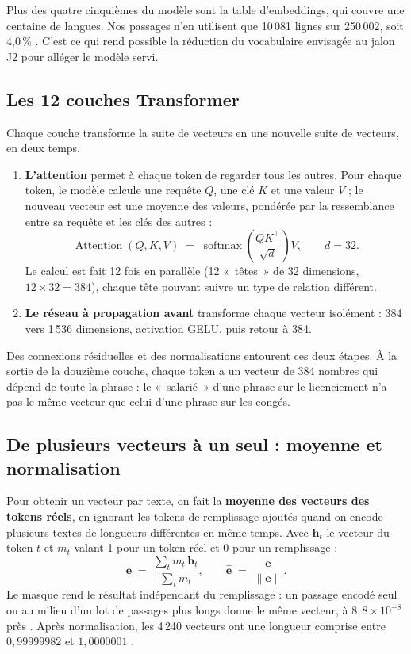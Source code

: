 Plus des quatre cinquièmes du modèle sont la table d'embeddings, qui couvre une centaine de langues. Nos passages
n'en utilisent que 10\,081 lignes sur 250\,002, soit 4,0\,\% \mesure. C'est ce qui rend possible la réduction du
vocabulaire envisagée au jalon J2 pour alléger le modèle servi.

\subsection{Les 12 couches Transformer}

Chaque couche transforme la suite de vecteurs en une nouvelle suite de vecteurs, en deux temps.

\begin{enumerate}
\item \textbf{L'attention} permet à chaque token de regarder tous les autres. Pour chaque token, le modèle calcule
  une requête $Q$, une clé $K$ et une valeur $V$ ; le nouveau vecteur est une moyenne des valeurs, pondérée par la
  ressemblance entre sa requête et les clés des autres :
  \[
    \operatorname{Attention}(Q,K,V) \;=\; \operatorname{softmax}\!\left(\frac{QK^{\top}}{\sqrt{d}}\right)V ,
    \qquad d = 32 .
  \]
  Le calcul est fait 12 fois en parallèle (12 «~têtes~» de 32 dimensions, $12 \times 32 = 384$), chaque tête pouvant
  suivre un type de relation différent.
\item \textbf{Le réseau à propagation avant} transforme chaque vecteur isolément : 384 vers 1\,536 dimensions,
  activation GELU, puis retour à 384.
\end{enumerate}
Des connexions résiduelles et des normalisations entourent ces deux étapes. À la sortie de la douzième couche,
chaque token a un vecteur de 384 nombres qui dépend de toute la phrase : le «~salarié~» d'une phrase sur le
licenciement n'a pas le même vecteur que celui d'une phrase sur les congés.

\subsection{De plusieurs vecteurs à un seul : moyenne et normalisation}

Pour obtenir un vecteur par texte, on fait la \textbf{moyenne des vecteurs des tokens réels}, en ignorant les
tokens de remplissage ajoutés quand on encode plusieurs textes de longueurs différentes en même temps. Avec
$\mathbf{h}_t$ le vecteur du token $t$ et $m_t$ valant 1 pour un token réel et 0 pour un remplissage :
\[
  \mathbf{e} \;=\; \frac{\sum_t m_t\,\mathbf{h}_t}{\sum_t m_t},
  \qquad
  \hat{\mathbf{e}} \;=\; \frac{\mathbf{e}}{\lVert\mathbf{e}\rVert} .
\]
Le masque rend le résultat indépendant du remplissage : un passage encodé seul ou au milieu d'un lot de passages
plus longs donne le même vecteur, à $8{,}8\times10^{-8}$ près \mesure. Après normalisation, les 4\,240 vecteurs
ont une longueur comprise entre $0{,}99999982$ et $1{,}0000001$ \mesure.

